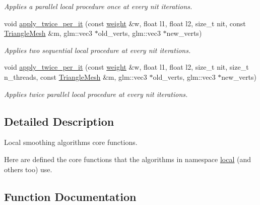 \begin{DoxyCompactItemize}
\begin{DoxyCompactList}\small\item\em Applies a parallel local procedure once at every {\itshape nit} iterations. \end{DoxyCompactList}\item 
void \hyperlink{namespacegeoproc_1_1smoothing_1_1local__private_a47b625e62ff0e3311c49bacaecb0a020}{apply\+\_\+twice\+\_\+per\+\_\+it} (const \hyperlink{namespacegeoproc_a12e5a10581b53b9dd9a509127527f843}{weight} \&w, float l1, float l2, size\+\_\+t nit, const \hyperlink{classgeoproc_1_1TriangleMesh}{Triangle\+Mesh} \&m, glm\+::vec3 $\ast$old\+\_\+verts, glm\+::vec3 $\ast$new\+\_\+verts)
\begin{DoxyCompactList}\small\item\em Applies two sequential local procedure at every {\itshape nit} iterations. \end{DoxyCompactList}\item 
void \hyperlink{namespacegeoproc_1_1smoothing_1_1local__private_ab4056c7402c96ea773e3d26d95b57033}{apply\+\_\+twice\+\_\+per\+\_\+it} (const \hyperlink{namespacegeoproc_a12e5a10581b53b9dd9a509127527f843}{weight} \&w, float l1, float l2, size\+\_\+t nit, size\+\_\+t n\+\_\+threads, const \hyperlink{classgeoproc_1_1TriangleMesh}{Triangle\+Mesh} \&m, glm\+::vec3 $\ast$old\+\_\+verts, glm\+::vec3 $\ast$new\+\_\+verts)
\begin{DoxyCompactList}\small\item\em Applies twice parallel local procedure at every {\itshape nit} iterations. \end{DoxyCompactList}\end{DoxyCompactItemize}


\subsection{Detailed Description}
Local smoothing algorithms core functions. 

Here are defined the core functions that the algorithms in namespace \hyperlink{namespacegeoproc_1_1smoothing_1_1local}{local} (and others too) use. 

\subsection{Function Documentation}
\mbox{\label{namespacegeoproc_1_1smoothing_1_1local__private_a233a9fc9782e2064cbd1c7006485a865}} 
